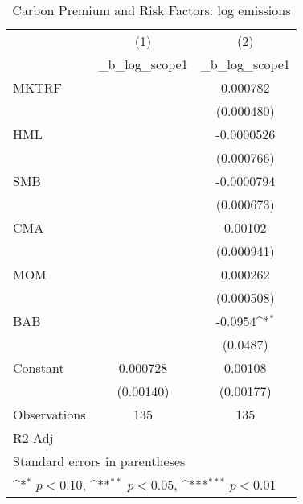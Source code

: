 \begin{table}[htbp]\centering
\def\sym#1{\ifmmode^{#1}\else\(^{#1}\)\fi}
\caption{Carbon Premium and Risk Factors: log emissions}
\begin{tabular}{l*{2}{c}}
\hline\hline
                    &\multicolumn{1}{c}{(1)}&\multicolumn{1}{c}{(2)}\\
                    &\multicolumn{1}{c}{\_b\_log\_scope1}&\multicolumn{1}{c}{\_b\_log\_scope1}\\
\hline
MKTRF               &                     &    0.000782         \\
                    &                     &  (0.000480)         \\
[1em]
HML                 &                     &  -0.0000526         \\
                    &                     &  (0.000766)         \\
[1em]
SMB                 &                     &  -0.0000794         \\
                    &                     &  (0.000673)         \\
[1em]
CMA                 &                     &     0.00102         \\
                    &                     &  (0.000941)         \\
[1em]
MOM                 &                     &    0.000262         \\
                    &                     &  (0.000508)         \\
[1em]
BAB                 &                     &     -0.0954\sym{*}  \\
                    &                     &    (0.0487)         \\
[1em]
Constant            &    0.000728         &     0.00108         \\
                    &   (0.00140)         &   (0.00177)         \\
\hline
Observations        &         135         &         135         \\
R2-Adj              &                     &                     \\
\hline\hline
\multicolumn{3}{l}{\footnotesize Standard errors in parentheses}\\
\multicolumn{3}{l}{\footnotesize \sym{*} \(p<0.10\), \sym{**} \(p<0.05\), \sym{***} \(p<0.01\)}\\
\end{tabular}
\end{table}
